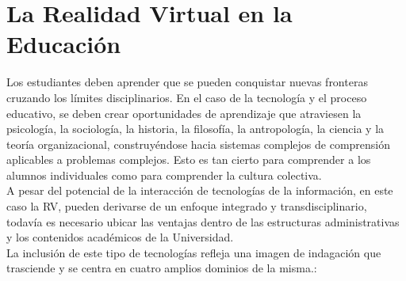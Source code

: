 \section{La Realidad Virtual en la Educaci\'on}
Los estudiantes deben aprender que se pueden conquistar nuevas fronteras cruzando los límites disciplinarios. En el caso de la tecnología y el proceso educativo, 
se deben crear oportunidades de aprendizaje que atraviesen la psicología, la sociología, la historia, la filosofía, la antropología, la ciencia y la teoría organizacional, 
construyéndose hacia sistemas complejos de comprensión aplicables a problemas complejos. Esto es tan cierto para comprender a los alumnos individuales como para comprender 
la cultura colectiva.\\
A pesar del potencial de la interacción de tecnologías de la información, en este caso la RV, pueden derivarse de un enfoque integrado y transdisciplinario, 
todavía es necesario ubicar las ventajas dentro de las estructuras administrativas y los contenidos académicos de la Universidad.\\ 
La inclusión de este tipo de tecnologías refleja una imagen de indagación que trasciende y se centra en cuatro amplios dominios de la misma.\cite{norton1994integrating}:
